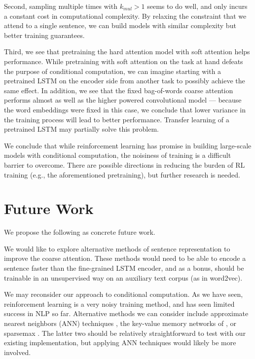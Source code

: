 \documentclass[12pt]{report}
\begin{document}
Second, sampling multiple times with $k_{mul} > 1$ seems to do well, and only incurs a constant cost in computational complexity. By relaxing the constraint that we attend to a single sentence, we can build models with similar complexity but better training guarantees. 


Third, we see that pretraining the hard attention model with soft attention helps performance. While pretraining with soft attention on the task at hand defeats the purpose of conditional computation, we can imagine starting with a pretrained LSTM on the encoder side from another task to possibly achieve the same effect.
In addition, we see that the fixed bag-of-words coarse attention performs almost as well as the higher powered convolutional model --- because the word embeddings were fixed in this case, we conclude that lower variance in the training process will lead to better performance. Transfer learning of a pretrained LSTM may partially solve this problem.

We conclude that while reinforcement learning has promise in building large-scale models with conditional computation, the noisiness of training is a difficult barrier to overcome. There are possible directions in reducing the burden of RL training (e.g., the aforementioned pretraining), but further research is needed.


\section{Future Work}

We propose the following as concrete future work.

We would like to explore alternative methods of sentence representation to improve the coarse attention. These methods would need to be able to encode a sentence faster than the fine-grained LSTM encoder, and as a bonus, should be trainable in an unsupervised way on an auxiliary text corpus (as in word2vec).

We may reconsider our approach to conditional computation. As we have seen, reinforcement learning is a very noisy training method, and has seen limited success in NLP so far.
Alternative methods we can consider include approximate nearest neighbors (ANN) techniques \citep{rae2016sparsememory}, the key-value memory networks of \citet{Miller2016}, or sparsemax \citep{martins2016sparsemax}. The latter two should be relatively straightforward to test with our existing implementation, but applying ANN techniques would likely be more involved.
\end{document}
